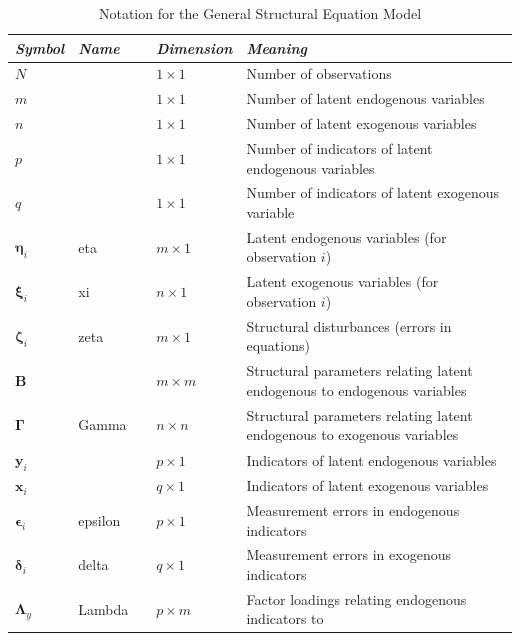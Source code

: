 \begin{table}[H]
\caption{Notation for the General Structural Equation Model}
\centering{}%
\begin{tabular}{llllp{6.0cm}}
\hline 
\textbf{\emph{\footnotesize{}Symbol}} & \textbf{\emph{\footnotesize{}Name}} &  & \textbf{\emph{\footnotesize{}Dimension}} & \textbf{\emph{\footnotesize{}Meaning}}\tabularnewline
\hline 
{\footnotesize{}$N$} &  &  & {\footnotesize{}$1\times1$} & {\footnotesize{}Number of observations}\tabularnewline
{\footnotesize{}$m$} &  &  & {\footnotesize{}$1\times1$} & {\footnotesize{}Number of latent endogenous variables}\tabularnewline
{\footnotesize{}$n$} &  &  & {\footnotesize{}$1\times1$} & {\footnotesize{}Number of latent exogenous variables}\tabularnewline
{\footnotesize{}$p$} &  &  & {\footnotesize{}$1\times1$} & {\footnotesize{}Number of indicators of latent endogenous variables}\tabularnewline
{\footnotesize{}$q$} &  &  & {\footnotesize{}$1\times1$} & {\footnotesize{}Number of indicators of latent exogenous variable}\tabularnewline
{\footnotesize{}$\bm{\eta}_{i}$} & {\footnotesize{}eta} &  & {\footnotesize{}$m\times1$} & {\footnotesize{}Latent endogenous variables (for observation $i$)}\tabularnewline
{\footnotesize{}$\bm{\xi}_{i}$} & {\footnotesize{}xi} &  & {\footnotesize{}$n\times1$} & {\footnotesize{}Latent exogenous variables (for observation $i$)}\tabularnewline
{\footnotesize{}$\bm{\zeta}_{i}$} & {\footnotesize{}zeta} &  & {\footnotesize{}$m\times1$} & {\footnotesize{}Structural disturbances (errors in equations)}\tabularnewline
{\footnotesize{}$\mathbf{B}$} &  &  & {\footnotesize{}$m\times m$} & {\footnotesize{}Structural parameters relating latent endogenous to
endogenous variables}\tabularnewline
{\footnotesize{}$\bm{\Gamma}$} & {\footnotesize{}Gamma} &  & {\footnotesize{}$n\times n$} & {\footnotesize{}Structural parameters relating latent endogenous to
exogenous variables}\tabularnewline
{\footnotesize{}$\mathbf{y}_{i}$} &  &  & {\footnotesize{}$p\times1$} & {\footnotesize{}Indicators of latent endogenous variables}\tabularnewline
{\footnotesize{}$\mathbf{x}_{i}$} &  &  & {\footnotesize{}$q\times1$} & {\footnotesize{}Indicators of latent exogenous variables}\tabularnewline
{\footnotesize{}$\bm{\epsilon}_{i}$} & {\footnotesize{}epsilon} &  & {\footnotesize{}$p\times1$} & {\footnotesize{}Measurement errors in endogenous indicators}\tabularnewline
{\footnotesize{}$\bm{\delta}_{i}$} & {\footnotesize{}delta} &  & {\footnotesize{}$q\times1$} & {\footnotesize{}Measurement errors in exogenous indicators}\tabularnewline
{\footnotesize{}$\bm{\Lambda}_{y}$} & {\footnotesize{}Lambda} &  & {\footnotesize{}$p\times m$} & {\footnotesize{}Factor loadings relating endogenous indicators to
}
\end{tabular}
\end{table}
